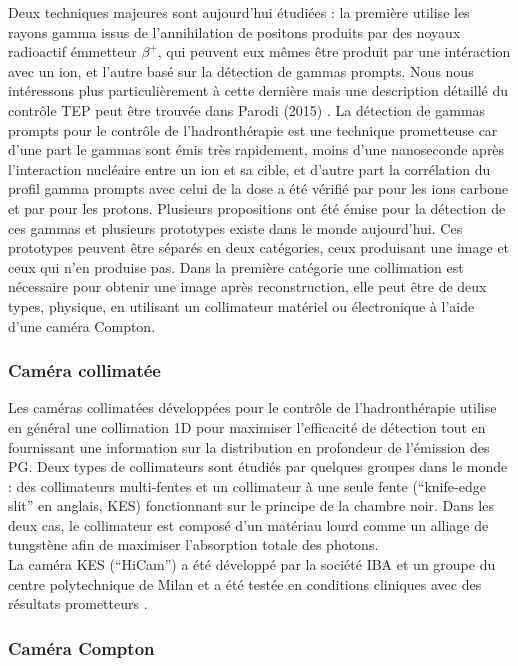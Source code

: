 \documentclass[11pt,a4paper,oldfontcommands]{memoir}
\begin{document}
Deux techniques majeures sont aujourd'hui étudiées : la première utilise les rayons gamma issus de l'annihilation de positons produits par des noyaux radioactif émmetteur $\beta^+$, qui peuvent eux mêmes être produit par une intéraction avec un ion, et l'autre basé sur la détection de gammas prompts. Nous nous intéressons plus particulièrement à cette dernière mais une description détaillé du contrôle TEP peut être trouvée dans Parodi (2015) \cite{Parodi20157153}. La détection de gammas prompts pour le contrôle de l'hadronthérapie est une technique prometteuse car d'une part le gammas sont émis très rapidement, moins d'une nanoseconde après l’interaction nucléaire entre un ion et sa cible, et d'autre part la corrélation du profil gamma prompts avec celui de la dose a été vérifié par \cite{PGMonitoringC12}pour les ions carbone et par \cite{Min2006} pour les protons. Plusieurs propositions ont été émise pour la détection de ces gammas et plusieurs prototypes existe dans le monde aujourd'hui. Ces prototypes peuvent être séparés en deux catégories, ceux produisant une image et ceux qui n'en produise pas. Dans la première catégorie une collimation est nécessaire pour obtenir une image après reconstruction, elle peut être de deux types, physique, en utilisant un collimateur matériel ou électronique à l'aide d'une caméra Compton. 


\subsubsection{Caméra collimatée}

Les caméras collimatées développées pour le contrôle de l'hadronthérapie utilise en général une collimation 1D pour maximiser l'efficacité de détection tout en fournissant une information sur la distribution en profondeur de l'émission des PG. Deux types de collimateurs sont étudiés par quelques groupes dans le monde : des collimateurs multi-fentes \cite{Pinto_2014,MinSimu} et un collimateur à une seule fente (\enquote{knife-edge slit} en anglais, KES) \cite{Smeets_2012} fonctionnant sur le principe de la chambre noir. Dans les deux cas, le collimateur est composé d'un matériau lourd comme un alliage de tungstène afin de maximiser l'absorption totale des photons. \\
La caméra KES (\enquote{HiCam}) a été développé par la société IBA et un groupe du centre polytechnique de Milan et a été testée en conditions cliniques avec des résultats prometteurs \cite{Richter2016}. 

\subsubsection{Caméra Compton}
\end{document}
